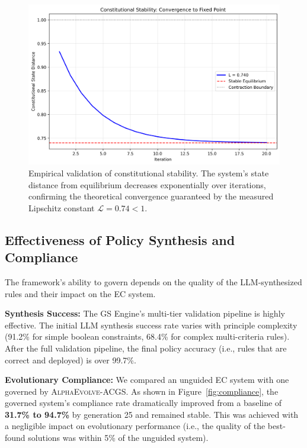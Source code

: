 \documentclass[10pt,twocolumn]{article}
\newcommand{\acgs}{\textsc{AlphaEvolve-ACGS}}
\newcommand{\lipschitz}{\mathcal{L}}
\theoremstyle{definition}
\begin{document}
\begin{figure}[H]
    \centering
    \includegraphics[width=\linewidth]{stability_analysis.png}
    \caption{Empirical validation of constitutional stability. The system's state distance from equilibrium decreases exponentially over iterations, confirming the theoretical convergence guaranteed by the measured Lipschitz constant $\lipschitz = 0.74 < 1$.}
    \label{fig:stability_analysis}
\end{figure}

\subsection{Effectiveness of Policy Synthesis and Compliance}
The framework's ability to govern depends on the quality of the LLM-synthesized rules and their impact on the EC system.

\textbf{Synthesis Success:} The GS Engine's multi-tier validation pipeline is highly effective. The initial LLM synthesis success rate varies with principle complexity (91.2\% for simple boolean constraints, 68.4\% for complex multi-criteria rules). After the full validation pipeline, the final policy accuracy (i.e., rules that are correct and deployed) is over 99.7\%.

\textbf{Evolutionary Compliance:} We compared an unguided EC system with one governed by \acgs{}. As shown in Figure~\ref{fig:compliance}, the governed system's compliance rate dramatically improved from a baseline of \textbf{31.7\% to 94.7\%} by generation 25 and remained stable. This was achieved with a negligible impact on evolutionary performance (i.e., the quality of the best-found solutions was within 5\% of the unguided system).
\end{document}
